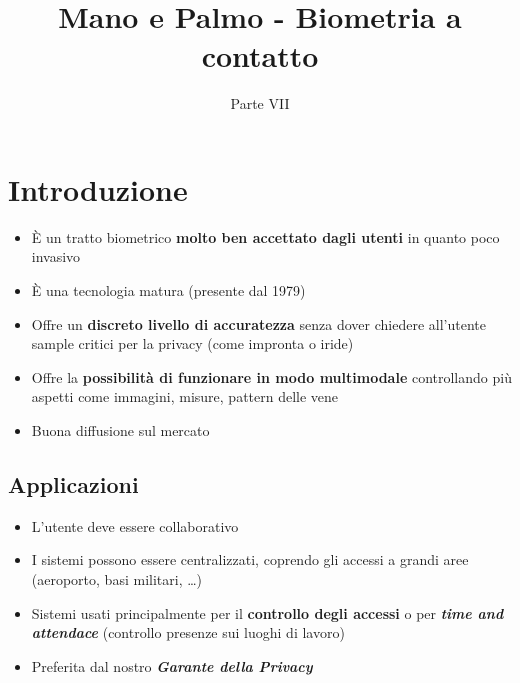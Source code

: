\documentclass{report}
\title{Mano e Palmo - Biometria a contatto}
\date{Parte VII}
\begin{document}
\maketitle

\tableofcontents
\newpage

\chapter{Introduzione}

\begin{itemize}
    \item È un tratto biometrico \textbf{molto ben accettato dagli utenti}
    in quanto poco invasivo
    \item È una tecnologia matura (presente dal 1979)
    \item Offre un \textbf{discreto livello di accuratezza} senza dover 
    chiedere all'utente sample critici per la privacy (come impronta o iride)
    \item Offre la \textbf{possibilità di funzionare in modo multimodale} controllando 
    più aspetti come immagini, misure, pattern delle vene
    \item Buona diffusione sul mercato
\end{itemize}

\section{Applicazioni}
\begin{itemize}
    \item L'utente deve essere collaborativo
    \item I sistemi possono essere centralizzati, coprendo gli accessi
    a grandi aree (aeroporto, basi militari, \dots)
    \item Sistemi usati principalmente per il \textbf{controllo degli accessi} o per \textit{\textbf{time and attendace}} (controllo presenze sui luoghi di lavoro)
    \item Preferita dal nostro \textbf{\textit{Garante della Privacy}}
\end{itemize}
\end{document}
